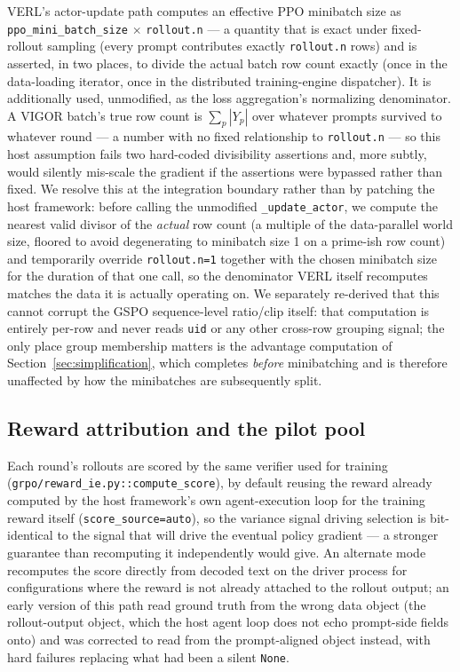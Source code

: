 \documentclass[11pt]{article}
\begin{document}
VERL's actor-update path computes an effective PPO minibatch size as
\texttt{ppo\_mini\_batch\_size} $\times$ \texttt{rollout.n} — a quantity that is
exact under fixed-rollout sampling (every prompt contributes exactly
\texttt{rollout.n} rows) and is asserted, in two places, to divide the actual batch
row count exactly (once in the data-loading iterator, once in the distributed
training-engine dispatcher). It is additionally used, unmodified, as the loss
aggregation's normalizing denominator. A VIGOR batch's true row count is
$\sum_p |Y_p|$ over whatever prompts survived to whatever round — a number with no
fixed relationship to \texttt{rollout.n} — so this host assumption fails two
hard-coded divisibility assertions and, more subtly, would silently mis-scale the
gradient if the assertions were bypassed rather than fixed. We resolve this at the
integration boundary rather than by patching the host framework: before calling the
unmodified \texttt{\_update\_actor}, we compute the nearest valid divisor of the
\emph{actual} row count (a multiple of the data-parallel world size, floored to
avoid degenerating to minibatch size 1 on a prime-ish row count) and temporarily
override \texttt{rollout.n=1} together with the chosen minibatch size for the
duration of that one call, so the denominator VERL itself recomputes matches the
data it is actually operating on. We separately re-derived that this cannot corrupt
the GSPO sequence-level ratio/clip itself: that computation is entirely per-row and
never reads \texttt{uid} or any other cross-row grouping signal; the only place
group membership matters is the advantage computation of Section~\ref{sec:simplification},
which completes \emph{before} minibatching and is therefore unaffected by how the
minibatches are subsequently split.

\subsection{Reward attribution and the pilot pool}

Each round's rollouts are scored by the same verifier used for training
(\texttt{grpo/reward\_ie.py::compute\_score}), by default reusing the reward already
computed by the host framework's own agent-execution loop for the training reward
itself (\texttt{score\_source=auto}), so the variance signal driving selection is
bit-identical to the signal that will drive the eventual policy gradient — a
stronger guarantee than recomputing it independently would give. An alternate mode
recomputes the score directly from decoded text on the driver process for
configurations where the reward is not already attached to the rollout output; an
early version of this path read ground truth from the wrong data object (the
rollout-output object, which the host agent loop does not echo prompt-side fields
onto) and was corrected to read from the prompt-aligned object instead, with hard
failures replacing what had been a silent \texttt{None}.
\end{document}
